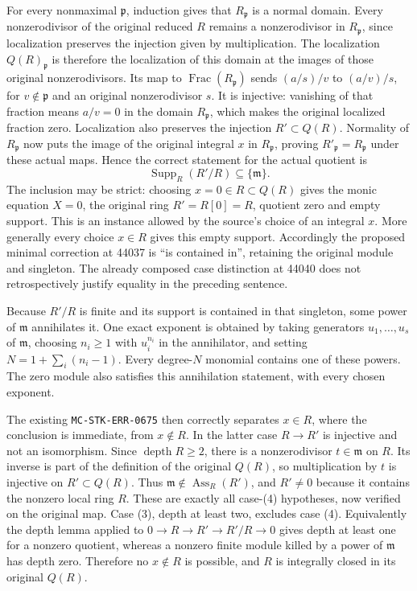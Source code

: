 For every nonmaximal \(\mathfrak p\), induction gives that \(R_{\mathfrak p}\) is a normal domain. Every nonzerodivisor of the original reduced \(R\) remains a nonzerodivisor in \(R_{\mathfrak p}\), since localization preserves the injection given by multiplication. The localization \(Q(R)_{\mathfrak p}\) is therefore the localization of this domain at the images of those original nonzerodivisors. Its map to \(\operatorname{Frac}(R_{\mathfrak p})\) sends \((a/s)/v\) to \((a/v)/s\), for \(v\notin\mathfrak p\) and an original nonzerodivisor \(s\). It is injective: vanishing of that fraction means \(a/v=0\) in the domain \(R_{\mathfrak p}\), which makes the original localized fraction zero. Localization also preserves the injection \(R'\subset Q(R)\). Normality of \(R_{\mathfrak p}\) now puts the image of the original integral \(x\) in \(R_{\mathfrak p}\), proving \(R'_{\mathfrak p}=R_{\mathfrak p}\) under these actual maps. Hence the correct statement for the actual quotient is \[
 \operatorname{Supp}_R(R'/R)\subseteq\{\mathfrak m\}.
\] The inclusion may be strict: choosing \(x=0\in R\subset Q(R)\) gives the monic equation \(X=0\), the original ring \(R'=R[0]=R\), quotient zero and empty support. This is an instance allowed by the source's choice of an integral \(x\). More generally every choice \(x\in R\) gives this empty support. Accordingly the proposed minimal correction at 44037 is ``is contained in'', retaining the original module and singleton. The already composed case distinction at 44040 does not retrospectively justify equality in the preceding sentence.

Because \(R'/R\) is finite and its support is contained in that singleton, some power of \(\mathfrak m\) annihilates it. One exact exponent is obtained by taking generators \(u_1,\ldots,u_s\) of \(\mathfrak m\), choosing \(n_i\geq1\) with \(u_i^{n_i}\) in the annihilator, and setting \(N=1+\sum_i(n_i-1)\). Every degree-\(N\) monomial contains one of these powers. The zero module also satisfies this annihilation statement, with every chosen exponent.

The existing \texttt{MC-STK-ERR-0675} then correctly separates \(x\in R\), where the conclusion is immediate, from \(x\notin R\). In the latter case \(R\to R'\) is injective and not an isomorphism. Since \(\operatorname{depth}R\geq2\), there is a nonzerodivisor \(t\in\mathfrak m\) on \(R\). Its inverse is part of the definition of the original \(Q(R)\), so multiplication by \(t\) is injective on \(R'\subset Q(R)\). Thus \(\mathfrak m\notin\operatorname{Ass}_R(R')\), and \(R'\ne0\) because it contains the nonzero local ring \(R\). These are exactly all case-(4) hypotheses, now verified on the original map. Case (3), depth at least two, excludes case (4). Equivalently the depth lemma applied to \(0\to R\to R'\to R'/R\to0\) gives depth at least one for a nonzero quotient, whereas a nonzero finite module killed by a power of \(\mathfrak m\) has depth zero. Therefore no \(x\notin R\) is possible, and \(R\) is integrally closed in its original \(Q(R)\).

